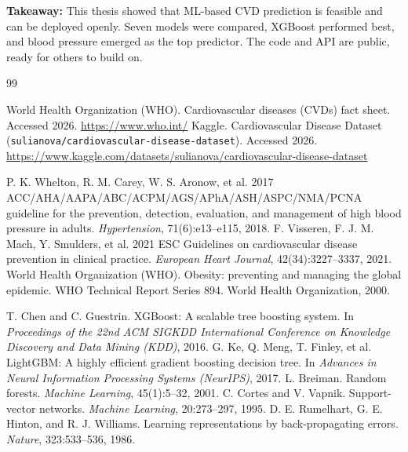 \documentclass[12pt, a4paper, oneside]{book}
\begin{document}
\begin{takeaway}
\textbf{Takeaway:} This thesis showed that ML-based CVD prediction is feasible and can be deployed openly. Seven models were compared, XGBoost performed best, and blood pressure emerged as the top predictor. The code and API are public, ready for others to build on.
\end{takeaway}

\clearpage
{}
\renewcommand{\bibname}{References}
\begin{thebibliography}{99}
\setlength{\itemsep}{0.25em}
 World Health Organization (WHO). Cardiovascular diseases (CVDs) fact sheet. Accessed 2026. \url{https://www.who.int/}
 Kaggle. Cardiovascular Disease Dataset (\texttt{sulianova/cardiovascular-disease-dataset}). Accessed 2026. \url{https://www.kaggle.com/datasets/sulianova/cardiovascular-disease-dataset}

 P. K. Whelton, R. M. Carey, W. S. Aronow, et al. 2017 ACC/AHA/AAPA/ABC/ACPM/AGS/APhA/ASH/ASPC/NMA/PCNA guideline for the prevention, detection, evaluation, and management of high blood pressure in adults. \textit{Hypertension}, 71(6):e13--e115, 2018.
 F. Visseren, F. J. M. Mach, Y. Smulders, et al. 2021 ESC Guidelines on cardiovascular disease prevention in clinical practice. \textit{European Heart Journal}, 42(34):3227--3337, 2021.
 World Health Organization (WHO). Obesity: preventing and managing the global epidemic. WHO Technical Report Series 894. World Health Organization, 2000.

 T. Chen and C. Guestrin. XGBoost: A scalable tree boosting system. In \textit{Proceedings of the 22nd ACM SIGKDD International Conference on Knowledge Discovery and Data Mining (KDD)}, 2016.
 G. Ke, Q. Meng, T. Finley, et al. LightGBM: A highly efficient gradient boosting decision tree. In \textit{Advances in Neural Information Processing Systems (NeurIPS)}, 2017.
 L. Breiman. Random forests. \textit{Machine Learning}, 45(1):5--32, 2001.
 C. Cortes and V. Vapnik. Support-vector networks. \textit{Machine Learning}, 20:273--297, 1995.
 D. E. Rumelhart, G. E. Hinton, and R. J. Williams. Learning representations by back-propagating errors. \textit{Nature}, 323:533--536, 1986.


\end{thebibliography}
\end{document}

